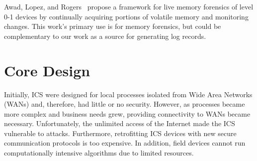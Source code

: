 \documentclass[conference]{IEEEtran}
\begin{document}
Awad, Lopez, and Rogers~\cite{c8} propose a framework for live memory forensics of level 0-1 devices by continually acquiring portions of volatile memory and monitoring changes.  This work's primary use is for memory forensics, but could be complementary to our work as a source for generating log records.
                                                                            
\section{Core Design}
Initially, ICS were designed for local processes isolated from Wide Area Networks (WANs) and, therefore, had little or no security. However, as processes became more complex and business needs grew, providing connectivity to WANs became necessary. 
Unfortunately, the unlimited access of the Internet made the ICS vulnerable to attacks. Furthermore, retrofitting ICS devices with new secure communication protocols is too expensive. In addition, field devices cannot run computationally intensive algorithms due to limited resources. 

\end{document}
